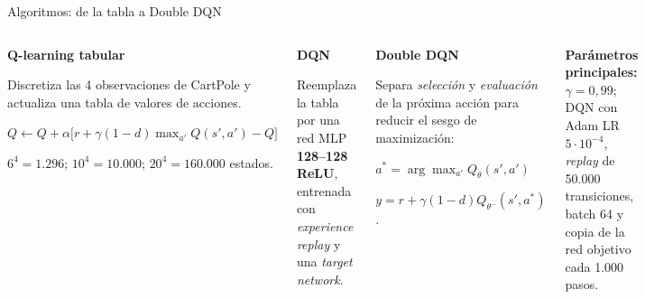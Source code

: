 \documentclass[aspectratio=169,10pt]{beamer}
\begin{document}
\begin{frame}{Algoritmos: de la tabla a Double DQN}
\begin{columns}[T,onlytextwidth]
\begin{info}
\textbf{Q-learning tabular}\par\vspace{.08cm}
\small Discretiza las 4 observaciones de CartPole y actualiza una tabla de valores de acciones.\par\vspace{.12cm}
\small $Q\leftarrow Q+\alpha\big[r+\gamma(1-d)\max_{a'}Q(s',a')-Q\big]$\par\vspace{.12cm}
\small $6^4=1.296$; $10^4=10.000$; $20^4=160.000$ estados. 
\end{info}
\vspace{.15cm}
\begin{info}
\textbf{DQN}\par\vspace{.07cm}
\small Reemplaza la tabla por una red MLP \textbf{128–128 ReLU}, entrenada con \emph{experience replay} y una \emph{target network}. 
\end{info}
\begin{info}
\textbf{Double DQN}\par\vspace{.07cm}
\small Separa \emph{selección} y \emph{evaluación} de la próxima acción para reducir el sesgo de maximización:\par\vspace{.12cm}
\small $a^*=\arg\max_{a'}Q_{\theta}(s',a')$\par\vspace{.05cm}
\small $y=r+\gamma(1-d)Q_{\theta^-}(s',a^*)$.
\end{info}
\vspace{.15cm}
\begin{takeaway}
\small \textbf{Parámetros principales:} $\gamma=0,99$; DQN con Adam LR $5\cdot10^{-4}$, \emph{replay} de 50.000 transiciones, batch 64 y copia de la red objetivo cada 1.000 pasos.
\end{takeaway}
\end{columns}
\end{frame}
\end{document}
